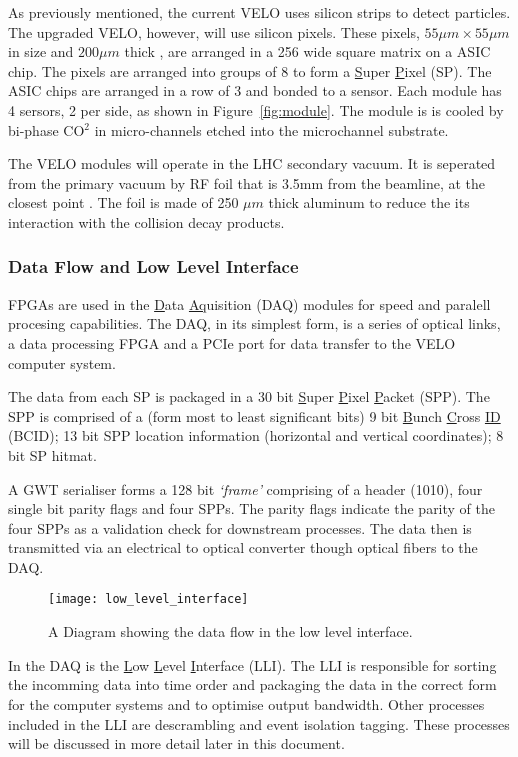       As previously mentioned, the current VELO uses silicon strips to detect particles.
      The upgraded VELO, however, will use silicon pixels.
      These pixels, $55 \mu m \times 55 \mu m$ in size and $200 \mu m$ thick \cite{velo_design_report}, are arranged in a 256 wide square matrix on a ASIC chip.
      The pixels are arranged into groups of 8 to form a \underline{S}uper \underline{P}ixel (SP).
      The ASIC chips are arranged in a row of 3 and bonded to a sensor.
      Each module has 4 sersors, 2 per side, as shown in Figure~\ref{fig:module}. 
      The module is is cooled by bi-phase CO$^2$ in micro-channels etched into the microchannel substrate.
      \par
      The VELO modules will operate in the LHC secondary vacuum.
      It is seperated from the primary vacuum by RF foil that is 3.5mm from the beamline, at the closest point \cite{velo_design_report}.
      The foil is made of 250 $\mu m$ thick aluminum to reduce the its interaction with the collision decay products. 

      \subsubsection{Data Flow and Low Level Interface}   

      FPGAs are used in the \underline{D}ata \underline{Aq}uisition (DAQ) modules for speed and paralell procesing capabilities.
      The DAQ, in its simplest form, is a series of optical links, a data processing FPGA and a PCIe port for data transfer to the VELO computer system.
      \par
      The data from each SP is packaged in a 30 bit \underline{S}uper \underline{P}ixel \underline{P}acket (SPP). The SPP is comprised of  a (form most to least significant bits) 9 bit \underline{B}unch \underline{C}ross \underline{ID} (BCID); 13 bit SPP location information (horizontal and vertical coordinates); 8 bit SP hitmat.
      \par
      A GWT serialiser forms a 128 bit \textit{`frame'} comprising of a header (1010), four single bit parity flags and four SPPs.
      The parity flags indicate the parity of the four SPPs as a validation check for downstream processes.
      The data then is transmitted via an electrical to optical converter though optical fibers to the DAQ.
      \begin{figure}[ht]
        \centering
        \texttt{[image: low\_level\_interface]}
        \caption{A Diagram showing the data flow in the low level interface.}
        \label{fig:lli}
      \end{figure}
      In the DAQ is the \underline{L}ow \underline{L}evel \underline{I}nterface (LLI).
      The LLI is responsible for sorting the incomming data into time order and packaging the data in the correct form for the computer systems and to optimise output bandwidth.
      Other processes included in the LLI are descrambling and event isolation tagging.
      These processes will be discussed in more detail later in this document.
